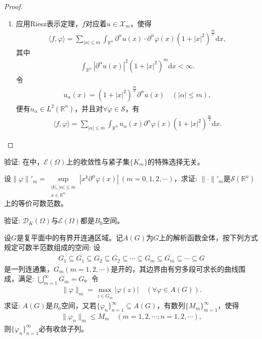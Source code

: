 \documentclass[../../main.tex]{subfiles}%
\begin{document}
\begin{proof}
\begin{enumerate}[(1)]
\item 应用Riesz表示定理，$f$对应着$u\in\mathscr{X}_m$，使得
\begin{align*}
\langle f,\varphi\rangle=\sum\limits_{|\alpha|\leqslant m}\int_{\mathbb{R}^n}\partial^\alpha u(x)\cdot\partial^\alpha\varphi(x)(1+|x|^2)^{\frac{m}{2}}\mathrm{d}x,
\end{align*}
其中
\begin{align*}
\int_{\mathbb{R}^n}|\partial^\alpha u(x)|^2(1+|x|^2)^m\mathrm{d}x<\infty.
\end{align*}
令
\begin{align*}
u_\alpha(x)=(1+|x|^2)^{\frac{m}{2}}\partial^\alpha u(x)\quad(|\alpha|\leqslant m),
\end{align*}
便有$u_\alpha\in L^2(\mathbb{R}^n)$，并且对$\forall\varphi\in\mathscr{S}$，有
\begin{align}
\langle f,\varphi\rangle=\sum\limits_{|\alpha|\leqslant m}\int_{\mathbb{R}^n}u_\alpha(x)\partial^\alpha\varphi(x)(1+|x|^2)^{\frac{m}{2}}\mathrm{d}x.\label{eq:4-2-7}
\end{align}
\end{enumerate}
\end{proof}

\begin{example}
验证: 在中，$\mathscr{E}(\Omega)$上的收敛性与紧子集$\{K_m\}$的特殊选择无关。
\end{example}

\begin{example}
设$\|\varphi\|'_m=\sup\limits_{\substack{|k|,|\alpha|\leqslant m\\x\in\mathbb{R}^n}}|x^k\partial^\alpha\varphi(x)|\ (m=0,1,2,\cdots)$，求证: $\|\cdot\|'_m$是$\mathscr{S}(\mathbb{R}^n)$上的等价可数范数。
\end{example}

\begin{example}
验证: $\mathscr{D}_K(\Omega)$与$\mathscr{E}(\Omega)$都是$B_0$空间。
\end{example}

\begin{example}
设$G$是复平面中的有界开连通区域。记$A(G)$为$G$上的解析函数全体，按下列方式规定可数半范数组成的空间: 设
\begin{align*}
G_1\subseteq\overline{G_1}\subseteq G_2\subseteq\overline{G_2}\subseteq\cdots\subseteq G_m\subseteq\overline{G_m}\subseteq\cdots\subseteq G
\end{align*}
是一列连通集，$G_m(m=1,2,\cdots)$是开的，其边界由有穷多段可求长的曲线围成，满足: $\bigcup\limits_{m=1}^\infty\overline{G_m}=G$。令
\begin{align*}
\|\varphi\|_m=\max_{z\in\overline{G_m}}|\varphi(z)| \quad (\forall\varphi\in A(G)).
\end{align*}
求证: $A(G)$是$B_0$空间，又若$\{\varphi_n\}_{n=1}^\infty\subseteq A(G)$，有数列$\{M_m\}_{m=1}^\infty$，使得
\begin{align*}
\|\varphi_n\|_m\leqslant M_m \quad (m=1,2,\cdots;n=1,2,\cdots),
\end{align*}
则$\{\varphi_n\}_{n=1}^\infty$必有收敛子列。
\end{example}
\end{document}
